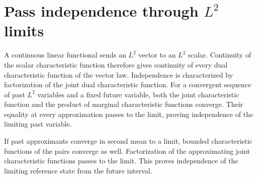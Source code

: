\documentclass[11pt,a4paper]{article}
\begin{document}
\section{\texorpdfstring{Pass independence through \(L^{2}\) limits}{Pass independence through L² limits}}


A continuous linear functional sends an \(L^{2}\) vector to an \(L^{2}\) scalar. Continuity of the scalar characteristic function therefore gives continuity of every dual characteristic function of the vector law. Independence is characterized by factorization of the joint dual characteristic function. For a convergent sequence of past \(L^{2}\) variables and a fixed future variable, both the joint characteristic function and the product of marginal characteristic functions converge. Their equality at every approximation passes to the limit, proving independence of the limiting past variable.



If past approximants converge in second mean to a limit, bounded characteristic functions of the pairs converge as well. Factorization of the approximating joint characteristic functions passes to the limit. This proves independence of the limiting reference state from the future interval.
\end{document}
